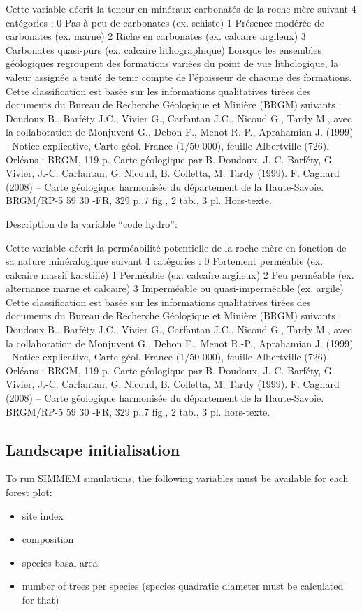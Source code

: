\documentclass[a4paper]{article}
\begin{document}
Cette variable décrit la teneur en minéraux carbonatés de la roche-mère suivant 4 catégories :
0  Pas à peu de carbonates (ex. schiste)
1  Présence modérée de carbonates (ex. marne)
2  Riche en carbonates (ex. calcaire argileux)
3  Carbonates quasi-purs (ex. calcaire lithographique)
Lorsque les ensembles géologiques regroupent des formations variées du point de vue lithologique, la valeur assignée a tenté de tenir compte de l’épaisseur de chacune des formations.
Cette classification est basée sur les informations qualitatives tirées des documents du Bureau de Recherche Géologique et Minière (BRGM) suivants :
Doudoux B., Barféty J.C., Vivier G., Carfantan J.C., Nicoud G., Tardy M., avec la collaboration de Monjuvent G., Debon F., Menot R.-P., Aprahamian J. (1999) - Notice explicative, Carte géol. France (1/50 000), feuille Albertville (726). Orléans : BRGM, 119 p. Carte géologique par B. Doudoux, J.-C. Barféty, G. Vivier, J.-C. Carfantan, G. Nicoud, B. Colletta, M. Tardy (1999).
F. Cagnard (2008) – Carte géologique harmonisée du département de la Haute-Savoie. BRGM/RP-5 59 30 -FR, 329 p.,7 fig., 2 tab., 3 pl. Hors-texte.

\noindent Description de la variable “code hydro”:

Cette variable décrit la perméabilité potentielle de la roche-mère en fonction de sa nature minéralogique suivant 4 catégories :
0  Fortement perméable (ex. calcaire massif karstifié)
1  Perméable (ex. calcaire argileux)
2  Peu perméable (ex. alternance marne et calcaire)
3  Imperméable ou quasi-imperméable (ex. argile)
Cette classification est basée sur les informations qualitatives tirées des documents du Bureau de Recherche Géologique et Minière (BRGM) suivants :
Doudoux B., Barféty J.C., Vivier G., Carfantan J.C., Nicoud G., Tardy M., avec la collaboration de Monjuvent G., Debon F., Menot R.-P., Aprahamian J. (1999) - Notice explicative, Carte géol. France (1/50 000), feuille Albertville (726). Orléans : BRGM, 119 p. Carte géologique par B. Doudoux, J.-C. Barféty, G. Vivier, J.-C. Carfantan, G. Nicoud, B. Colletta, M. Tardy (1999).
F. Cagnard (2008) – Carte géologique harmonisée du département de la Haute-Savoie. BRGM/RP-5 59 30 -FR, 329 p.,7 fig., 2 tab., 3 pl. hors-texte.


\subsection*{Landscape initialisation}
To run SIMMEM simulations, the following variables must be available for each forest plot:
\begin{itemize}
    \item site index
    \item composition
    \item species basal area
    \item number of trees per species (species quadratic diameter must be calculated for that)
\end{itemize}
\end{document}
